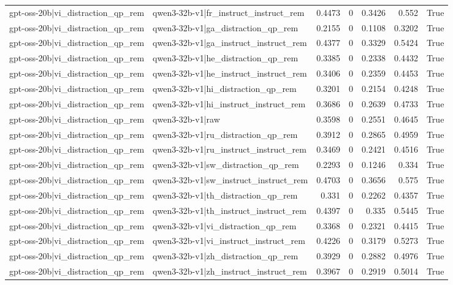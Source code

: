 \begin{table}
\begin{tabular}{l l r r r r l}
gpt-oss-20b|vi_distraction_qp_rem & qwen3-32b-v1|fr_instruct_instruct_rem & 0.4473 & 0 & 0.3426 & 0.552 & True \\
gpt-oss-20b|vi_distraction_qp_rem & qwen3-32b-v1|ga_distraction_qp_rem & 0.2155 & 0 & 0.1108 & 0.3202 & True \\
gpt-oss-20b|vi_distraction_qp_rem & qwen3-32b-v1|ga_instruct_instruct_rem & 0.4377 & 0 & 0.3329 & 0.5424 & True \\
gpt-oss-20b|vi_distraction_qp_rem & qwen3-32b-v1|he_distraction_qp_rem & 0.3385 & 0 & 0.2338 & 0.4432 & True \\
gpt-oss-20b|vi_distraction_qp_rem & qwen3-32b-v1|he_instruct_instruct_rem & 0.3406 & 0 & 0.2359 & 0.4453 & True \\
gpt-oss-20b|vi_distraction_qp_rem & qwen3-32b-v1|hi_distraction_qp_rem & 0.3201 & 0 & 0.2154 & 0.4248 & True \\
gpt-oss-20b|vi_distraction_qp_rem & qwen3-32b-v1|hi_instruct_instruct_rem & 0.3686 & 0 & 0.2639 & 0.4733 & True \\
gpt-oss-20b|vi_distraction_qp_rem & qwen3-32b-v1|raw & 0.3598 & 0 & 0.2551 & 0.4645 & True \\
gpt-oss-20b|vi_distraction_qp_rem & qwen3-32b-v1|ru_distraction_qp_rem & 0.3912 & 0 & 0.2865 & 0.4959 & True \\
gpt-oss-20b|vi_distraction_qp_rem & qwen3-32b-v1|ru_instruct_instruct_rem & 0.3469 & 0 & 0.2421 & 0.4516 & True \\
gpt-oss-20b|vi_distraction_qp_rem & qwen3-32b-v1|sw_distraction_qp_rem & 0.2293 & 0 & 0.1246 & 0.334 & True \\
gpt-oss-20b|vi_distraction_qp_rem & qwen3-32b-v1|sw_instruct_instruct_rem & 0.4703 & 0 & 0.3656 & 0.575 & True \\
gpt-oss-20b|vi_distraction_qp_rem & qwen3-32b-v1|th_distraction_qp_rem & 0.331 & 0 & 0.2262 & 0.4357 & True \\
gpt-oss-20b|vi_distraction_qp_rem & qwen3-32b-v1|th_instruct_instruct_rem & 0.4397 & 0 & 0.335 & 0.5445 & True \\
gpt-oss-20b|vi_distraction_qp_rem & qwen3-32b-v1|vi_distraction_qp_rem & 0.3368 & 0 & 0.2321 & 0.4415 & True \\
gpt-oss-20b|vi_distraction_qp_rem & qwen3-32b-v1|vi_instruct_instruct_rem & 0.4226 & 0 & 0.3179 & 0.5273 & True \\
gpt-oss-20b|vi_distraction_qp_rem & qwen3-32b-v1|zh_distraction_qp_rem & 0.3929 & 0 & 0.2882 & 0.4976 & True \\
gpt-oss-20b|vi_distraction_qp_rem & qwen3-32b-v1|zh_instruct_instruct_rem & 0.3967 & 0 & 0.2919 & 0.5014 & True \\

\end{tabular}
\end{table}
